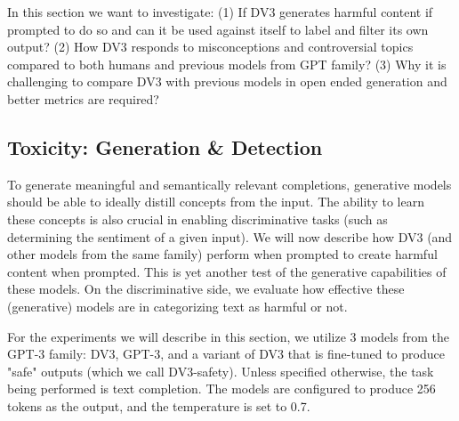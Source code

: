
In this section we want to investigate: (1) If DV3 generates harmful content if prompted to do so and can it be used against itself to label and filter its own output? (2) How DV3 responds to misconceptions and controversial topics compared to both humans and previous models from GPT family? (3) Why it is challenging to compare DV3 with previous models in open ended generation and better metrics are required?


\subsection{Toxicity: Generation \& Detection}

To generate meaningful and semantically relevant completions, generative models should be able to ideally distill concepts from the input. The ability to learn these concepts is also crucial in enabling discriminative tasks (such as determining the sentiment of a given input). We will now describe how DV3 (and other models from the same family) perform when prompted to create harmful content when prompted. This is yet another test of the generative capabilities of these models. On the discriminative side, we evaluate how effective these (generative) models are in categorizing text as harmful or not.

For the experiments we will describe in this section, we utilize 3 models from the GPT-3 family: DV3, GPT-3, and a variant of DV3 that is fine-tuned to produce "safe" outputs (which we call DV3-safety). Unless specified otherwise, the task being performed is text completion. The models are configured to produce 256 tokens as the output, and the temperature is set to 0.7.


